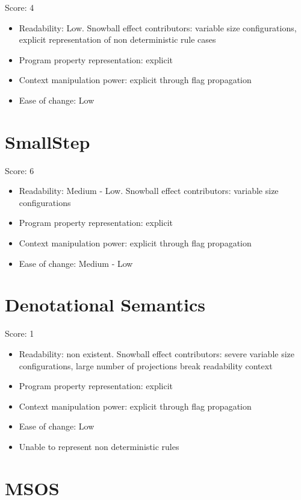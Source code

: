 \documentclass{article}
\begin{document}
	Score: 4
	
	\begin{itemize}
	\item Readability: Low. Snowball effect contributors: variable size configurations, explicit representation of non deterministic rule cases
	\item Program property representation: explicit
	\item Context manipulation power: explicit through flag propagation
	\item Ease of change: Low
	\end{itemize}
	
\section{SmallStep}

	Score: 6
	
	\begin{itemize}
	\item Readability: Medium - Low. Snowball effect contributors: variable size configurations
	\item Program property representation: explicit
	\item Context manipulation power: explicit through flag propagation
	\item Ease of change: Medium - Low
	\end{itemize}


\section{Denotational Semantics}

	Score: 1
	
	\begin{itemize}
	\item Readability: non existent. Snowball effect contributors: severe variable size configurations, large number of projections break readability context
	\item Program property representation: explicit
	\item Context manipulation power: explicit through flag propagation
	\item Ease of change: Low
	\item Unable to represent non deterministic rules
	\end{itemize}

\section{MSOS}
\end{document}
